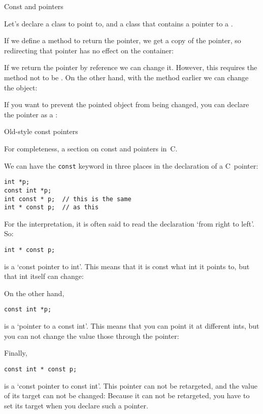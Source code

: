  {Const and pointers}

Let's declare a class  to point to, and a class 
that contains a pointer to a .

\begin{multicols}{2}
\end{multicols}

If we define a method to return the pointer, we get a copy of the
pointer, so redirecting that pointer has no effect on the container:
%

If we return the pointer by reference we can
change it. However, this requires the method not to be .
On the other hand, with the  method earlier we can change the
object:
%

If you want to prevent the pointed object from being changed, you can
declare the pointer as a :
%
\begin{multicols}{2}
\end{multicols}

 {Old-style const pointers}

For completeness, a section on const and pointers in~C.

We can have the \lstinline{const} keyword in three places
in the declaration of a C~pointer:
\begin{lstlisting}
int *p;
const int *p;
int const * p;  // this is the same
int * const p;  // as this
\end{lstlisting}

For the interpretation, it is often said to read the declaration
`from right to left'.
So:
\begin{lstlisting}
int * const p;
\end{lstlisting}
is a `const pointer to int'.
This means that it is const what int it points to,
but that int itself can change:

On the other hand,
\begin{lstlisting}
const int *p;
\end{lstlisting}
is a `pointer to a const int'.
This means that you can point it at different ints,
but you can not change the value those through the pointer:

Finally,
\begin{lstlisting}
const int * const p;
\end{lstlisting}
is a `const pointer to const int'.
This pointer can not be retargeted, and the value
of its target can not be changed:
Because it can not be retargeted,
you have to set its target when you declare such a pointer.

